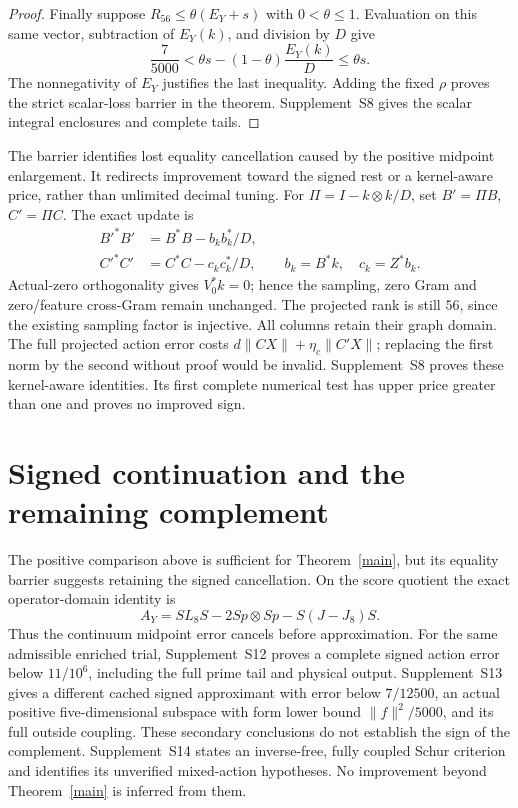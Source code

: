 \documentclass[12pt]{article}
\theoremstyle{remark}\newtheorem{remark}[theorem]{Remark}
\begin{document}
\begin{proof}
Finally suppose $R_{56}\le\theta(E_Y+s)$ with $0<\theta\le1$.
Evaluation on this same vector, subtraction of $E_Y(k)$, and division
by $D$ give
\[
 \frac7{5000}<\theta s-(1-\theta)\frac{E_Y(k)}D
                                    \le\theta s.
\]
The nonnegativity of $E_Y$ justifies the last inequality. Adding the
fixed $\rho$ proves the strict scalar-loss barrier in the theorem.
Supplement~S8 gives the scalar integral enclosures and complete tails.
\end{proof}

The barrier identifies lost equality cancellation caused by the positive
midpoint enlargement. It redirects improvement toward the signed rest
or a kernel-aware price, rather than unlimited decimal tuning.
For $\Pi=I-k\otimes k/D$, set $B'=\Pi B$, $C'=\Pi C$.
The exact update is
\begin{align*}
 B'^*B'&=B^*B-b_kb_k^*/D,\\
 C'^*C'&=C^*C-c_kc_k^*/D,\qquad b_k=B^*k,\quad c_k=Z^*b_k.
\end{align*}
Actual-zero orthogonality gives $V_0^*k=0$; hence the sampling,
zero Gram and zero/feature cross-Gram remain unchanged. The projected
rank is still $56$, since the existing sampling factor is injective.
All columns retain their graph domain. The full projected action error
costs $d\|CX\|+\eta_c\|C'X\|$; replacing the first norm by the
second without proof would be invalid. Supplement~S8 proves these kernel-aware identities. Its first complete numerical
test has upper price greater than one and proves no improved sign.

\section{Signed continuation and the remaining complement}
The positive comparison above is sufficient for Theorem~\ref{main}, but
its equality barrier suggests retaining the signed cancellation. On the
score quotient the exact operator-domain identity is
\[
 A_Y=SL_8S-2Sp\otimes Sp-S(J-J_8)S.
\]
Thus the continuum midpoint error cancels before approximation. For the
same admissible enriched trial, Supplement~S12 proves a complete signed
action error below $11/10^6$, including the full prime tail and physical
output. Supplement~S13 gives a different cached signed approximant with
error below $7/12500$, an actual positive five-dimensional subspace with
form lower bound $\|f\|^2/5000$, and its full outside coupling. These
secondary conclusions do not establish the sign of the complement.
Supplement~S14 states an inverse-free, fully coupled Schur criterion and
identifies its unverified mixed-action hypotheses. No improvement beyond
Theorem~\ref{main} is inferred from them.
\end{document}
